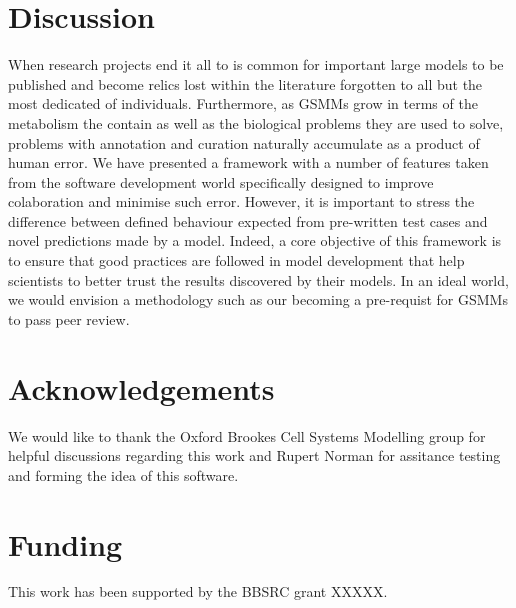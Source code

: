 \documentclass{bioinfo}
\begin{document}
\section{Discussion}
When research projects end it all to is common for important large models to be published and become relics lost within the literature forgotten to all but the most dedicated of individuals.
Furthermore, as GSMMs grow in terms of the metabolism the contain as well as the biological problems they are used to solve, problems with annotation and curation naturally accumulate as a product of human error.
We have presented a framework with a number of features taken from the software development world specifically designed to improve colaboration and minimise such error.
However, it is important to stress the difference between defined behaviour expected from pre-written test cases and novel predictions made by a model.
Indeed, a core objective of this framework is to ensure that good practices are followed in model development that help scientists to better trust the results discovered by their models.
In an ideal world, we would envision a methodology such as our becoming a pre-requist for GSMMs to pass peer review. 

\section*{Acknowledgements}
We would like to thank the Oxford Brookes Cell Systems Modelling group for helpful discussions regarding this work and Rupert Norman for assitance testing and forming the idea of this software.

\section*{Funding}
This work has been supported by the BBSRC grant XXXXX.




\end{document}
